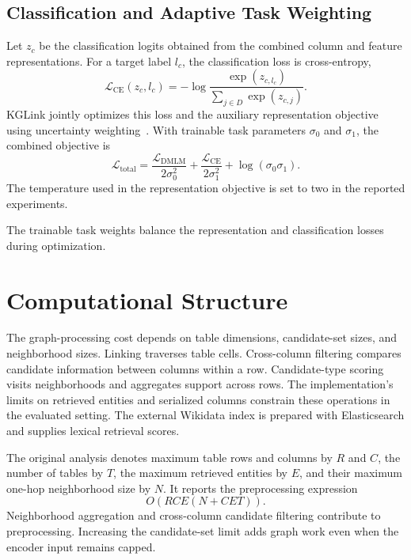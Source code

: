 \subsection{Classification and Adaptive Task Weighting}
\label{sec:kglink:objective}

Let $z_c$ be the classification logits obtained from the combined column and feature representations. For a target label $l_c$, the classification loss is cross-entropy,
\begin{equation}
\mathcal{L}_{\mathrm{CE}}(z_c,l_c)
 =-\log\frac{\exp(z_{c,l_c})}{\sum_{j\in D}\exp(z_{c,j})}.
\label{eq:kglink:classification}
\end{equation}
KGLink jointly optimizes this loss and the auxiliary representation objective using uncertainty weighting~\cite{kglink-kendall2018multi}. With trainable task parameters $\sigma_0$ and $\sigma_1$, the combined objective is
\begin{equation}
\mathcal{L}_{\mathrm{total}}
 =\frac{\mathcal{L}_{\mathrm{DMLM}}}{2\sigma_0^2}
  +\frac{\mathcal{L}_{\mathrm{CE}}}{2\sigma_1^2}
  +\log(\sigma_0\sigma_1).
\label{eq:kglink:joint-loss}
\end{equation}
The temperature used in the representation objective is set to two in the reported experiments.

The trainable task weights balance the representation and classification losses during optimization.

\section{Computational Structure}
\label{sec:kglink:complexity}

The graph-processing cost depends on table dimensions, candidate-set sizes, and neighborhood sizes. Linking traverses table cells. Cross-column filtering compares candidate information between columns within a row. Candidate-type scoring visits neighborhoods and aggregates support across rows. The implementation's limits on retrieved entities and serialized columns constrain these operations in the evaluated setting. The external Wikidata index is prepared with Elasticsearch and supplies lexical retrieval scores.

The original analysis denotes maximum table rows and columns by $R$ and $C$, the number of tables by $T$, the maximum retrieved entities by $E$, and their maximum one-hop neighborhood size by $N$. It reports the preprocessing expression
\begin{equation}
O\!\left(RCE(N+CET)\right).
\label{eq:kglink:preprocessing}
\end{equation}
Neighborhood aggregation and cross-column candidate filtering contribute to preprocessing. Increasing the candidate-set limit adds graph work even when the encoder input remains capped.

